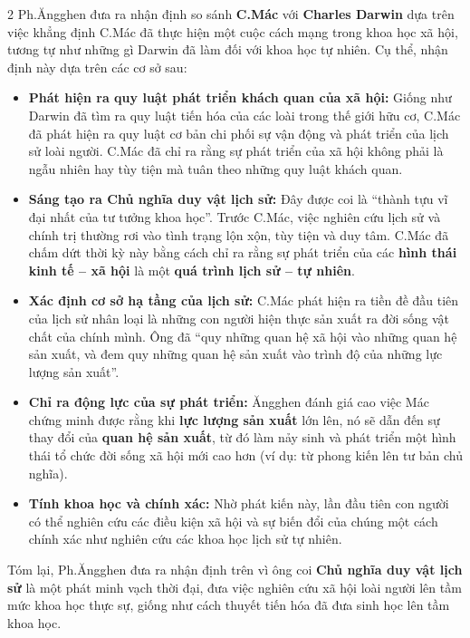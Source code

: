 \documentclass[9pt,a4paper]{extarticle}
\begin{document}
\begin{multicols*}{2}
Ph.Ăngghen đưa ra nhận định so sánh \textbf{C.Mác} với \textbf{Charles Darwin} dựa trên việc khẳng định C.Mác đã thực hiện một cuộc cách mạng trong khoa học xã hội, tương tự như những gì Darwin đã làm đối với khoa học tự nhiên. Cụ thể, nhận định này dựa trên các cơ sở sau:

\begin{itemize}
\item \textbf{Phát hiện ra quy luật phát triển khách quan của xã hội:} Giống như Darwin đã tìm ra quy luật tiến hóa của các loài trong thế giới hữu cơ, C.Mác đã phát hiện ra quy luật cơ bản chi phối sự vận động và phát triển của lịch sử loài người. C.Mác đã chỉ ra rằng sự phát triển của xã hội không phải là ngẫu nhiên hay tùy tiện mà tuân theo những quy luật khách quan.
\item \textbf{Sáng tạo ra Chủ nghĩa duy vật lịch sử:} Đây được coi là ``thành tựu vĩ đại nhất của tư tưởng khoa học''. Trước C.Mác, việc nghiên cứu lịch sử và chính trị thường rơi vào tình trạng lộn xộn, tùy tiện và duy tâm. C.Mác đã chấm dứt thời kỳ này bằng cách chỉ ra rằng sự phát triển của các \textbf{hình thái kinh tế -- xã hội} là một \textbf{quá trình lịch sử -- tự nhiên}.
\item \textbf{Xác định cơ sở hạ tầng của lịch sử:} C.Mác phát hiện ra tiền đề đầu tiên của lịch sử nhân loại là những con người hiện thực sản xuất ra đời sống vật chất của chính mình. Ông đã ``quy những quan hệ xã hội vào những quan hệ sản xuất, và đem quy những quan hệ sản xuất vào trình độ của những lực lượng sản xuất''.
\item \textbf{Chỉ ra động lực của sự phát triển:} Ăngghen đánh giá cao việc Mác chứng minh được rằng khi \textbf{lực lượng sản xuất} lớn lên, nó sẽ dẫn đến sự thay đổi của \textbf{quan hệ sản xuất}, từ đó làm nảy sinh và phát triển một hình thái tổ chức đời sống xã hội mới cao hơn (ví dụ: từ phong kiến lên tư bản chủ nghĩa).
\item \textbf{Tính khoa học và chính xác:} Nhờ phát kiến này, lần đầu tiên con người có thể nghiên cứu các điều kiện xã hội và sự biến đổi của chúng một cách chính xác như nghiên cứu các khoa học lịch sử tự nhiên.
\end{itemize}

Tóm lại, Ph.Ăngghen đưa ra nhận định trên vì ông coi \textbf{Chủ nghĩa duy vật lịch sử} là một phát minh vạch thời đại, đưa việc nghiên cứu xã hội loài người lên tầm mức khoa học thực sự, giống như cách thuyết tiến hóa đã đưa sinh học lên tầm khoa học.


\end{multicols*}
\end{document}
